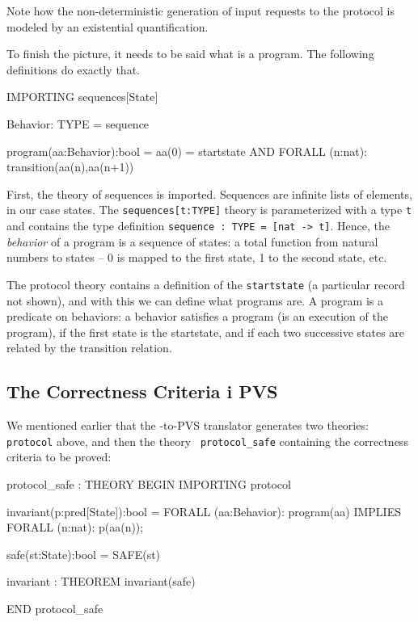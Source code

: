 Note how the non-deterministic generation of input requests to the protocol
is modeled by an existential quantification.

To finish the picture, it needs to be said what is a program. The following
definitions do exactly that.

\begin{smallsession}
  IMPORTING sequences[State]

  Behavior: TYPE = sequence

  program(aa:Behavior):bool =
    aa(0) = startstate 
      AND 
    FORALL (n:nat): transition(aa(n),aa(n+1))
\end{smallsession}

First,  the theory of sequences   is imported.  Sequences are infinite
lists of elements, in our  case  states.  The {\tt  sequences[t:TYPE]}
theory is  parameterized with  a type {\tt   t} and contains  the type
definition {\tt sequence  : TYPE =  [nat -> t]}. Hence, the  {\em
behavior} of a program is a sequence of states: a total function from
natural numbers to states -- 0 is mapped  to the first state, 1 to
the second state, etc.

The protocol theory contains a  definition of the  {\tt startstate} (a
particular  record not  shown),  and  with  this we  can  define  what
programs are.  A  program is  a predicate on behaviors:  a  behavior
satisfies a  program (is an execution of the program), if the first
state is the startstate, and if each two successive states are related
by the transition relation.


\subsection{The Correctness Criteria i PVS}

We mentioned earlier that the \Murphi{}-to-PVS translator generates two
theories:   {\tt   protocol}   above,  and   then   the   theory  {\tt
protocol\_safe} containing the correctness criteria to be proved:

\begin{smallsession}
  protocol_safe : THEORY
  BEGIN
    IMPORTING protocol

    invariant(p:pred[State]):bool =
      FORALL (aa:Behavior):
        program(aa) IMPLIES
          FORALL (n:nat): p(aa(n));

    safe(st:State):bool =
      SAFE(st)

    invariant : THEOREM invariant(safe)

  END protocol_safe
\end{smallsession}

